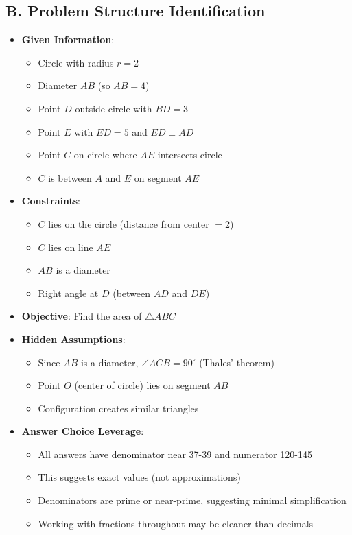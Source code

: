 \documentclass[]{article}
\begin{document}
\begin{problemconfigbox}
\subsection*{B. Problem Structure Identification}
\begin{itemize}[leftmargin=*]
    \item \textbf{Given Information}: 
    \begin{itemize}
        \item Circle with radius $r = 2$
        \item Diameter $AB$ (so $AB = 4$)
        \item Point $D$ outside circle with $BD = 3$
        \item Point $E$ with $ED = 5$ and $ED \perp AD$
        \item Point $C$ on circle where $AE$ intersects circle
        \item $C$ is between $A$ and $E$ on segment $AE$
    \end{itemize}
    \item \textbf{Constraints}: 
    \begin{itemize}
        \item $C$ lies on the circle (distance from center $= 2$)
        \item $C$ lies on line $AE$
        \item $AB$ is a diameter
        \item Right angle at $D$ (between $AD$ and $DE$)
    \end{itemize}
    \item \textbf{Objective}: Find the area of $\triangle ABC$
    \item \textbf{Hidden Assumptions}: 
    \begin{itemize}
        \item Since $AB$ is a diameter, $\angle ACB = 90^\circ$ (Thales' theorem)
        \item Point $O$ (center of circle) lies on segment $AB$
        \item Configuration creates similar triangles
    \end{itemize}
    \item \textbf{Answer Choice Leverage}: 
    \begin{itemize}
        \item All answers have denominator near 37-39 and numerator 120-145
        \item This suggests exact values (not approximations)
        \item Denominators are prime or near-prime, suggesting minimal simplification
        \item Working with fractions throughout may be cleaner than decimals
    \end{itemize}
\end{itemize}


\end{problemconfigbox}
\end{document}
